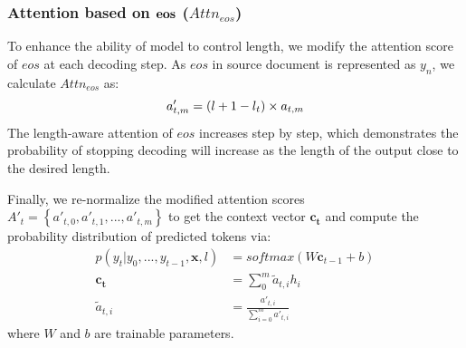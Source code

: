 \subsubsection{Attention based on $\bf eos$ ($Attn_{eos}$)}
To enhance the ability of model to control length,
we modify the attention score of $eos$ at each decoding step.
As $eos$ in source document is represented as $y_n$, we calculate $Attn_{eos}$ as:
\begin{equation}
 	a'_{t,m}=(l+1-l_t) \times a_{t,m} \\
\end{equation}
The length-aware attention of $eos$ increases step by step, 
which demonstrates the probability of stopping decoding will increase
as the length of the output close to the desired length.


Finally, we re-normalize the modified attention scores $A'_t=\left\{a'_{t,0}, a'_{t,1},...,a'_{t,m}\right\}$ to get the context vector $\mathbf{c_t}$ and compute the probability distribution of predicted tokens via:
\begin{align}
	p(y_t|y_0,...,y_{t-1},\mathbf{x},l) &=softmax(W \mathbf{c}_{t-1}+b) \\
	\mathbf{c_t} &=\sum_{0}^{m} \tilde{a}_{t,i} h_i \\
	\tilde{a}_{t,i} &= \frac{a'_{t,i}}{\sum_{i=0}^{m}a'_{t,i}}
\end{align}
where $W$ and $b$ are trainable parameters.




